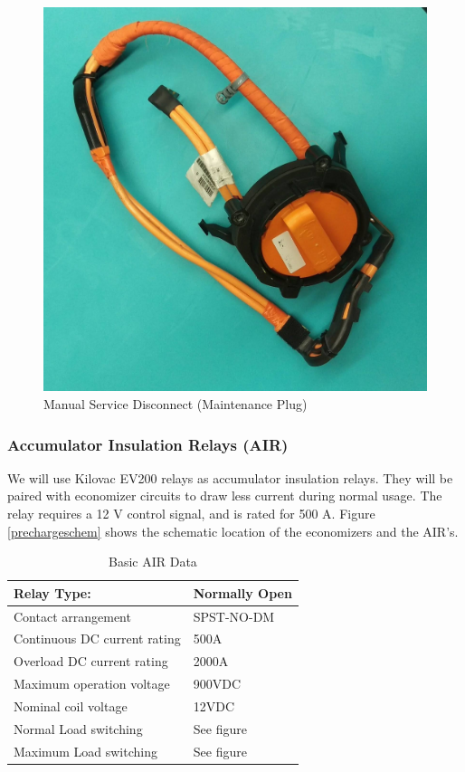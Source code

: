 \documentclass{article}
\begin{document}
            
            \begin{figure}[H]
                \centering
                \includegraphics[width = 0.5 \textwidth]{msd_highres}
                \caption{Manual Service Disconnect (Maintenance Plug)}
                \label{msd03}
            \end{figure}

        \subsubsection{Accumulator Insulation Relays (AIR)} \label{airs}

            
            We will use Kilovac EV200 relays as accumulator insulation relays. They will be paired with economizer circuits to draw less current during normal usage. The relay requires a 12 V control signal, and is rated for 500 A. Figure \ref{prechargeschem} shows the schematic location of the economizers and the AIR's.

            \begin{table}[H]
            \centering
            \begin{tabular}{|l|l|}
            \hline
            Relay Type: & Normally Open \\ \hline
            Contact arrangement & SPST-NO-DM \\ \hline
            Continuous DC current rating & 500A \\ \hline
            Overload DC current rating & 2000A \\ \hline
            Maximum operation voltage & 900VDC \\ \hline
            Nominal coil voltage & 12VDC \\ \hline
            Normal Load switching & See figure \\ \hline
            Maximum Load switching & See figure \\ \hline
            \end{tabular}
            \caption{Basic AIR Data}
            \label{air}
            \end{table}
            
\end{document}
